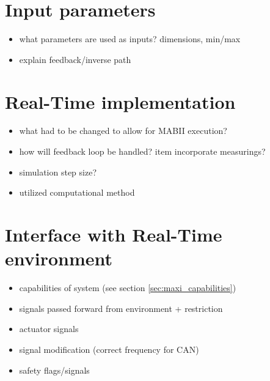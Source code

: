 \documentclass[ExampleMasters.tex]{subfiles}
\begin{document}
\section{Input parameters}
\label{sec:input_parameters}

\begin{itemize}
	\item what parameters are used as inputs? dimensions, min/max
	\item explain feedback/inverse path
	
\end{itemize}

\section{Real-Time implementation}
\label{sec:real_time_implementation}

\begin{itemize}
	\item what had to be changed to allow for MABII execution?
	\item how will feedback loop be handled?
	item incorporate measurings?
	\item simulation step size?
	\item utilized computational method
\end{itemize}

\section{Interface with Real-Time environment}
\label{sec:interface_with_real_time}

\begin{itemize}
	\item capabilities of system (see section \ref{sec:maxi_capabilities})
	\item signals passed forward from environment + restriction
	
	\item actuator signals
	\item signal modification (correct frequency for CAN)
	\item safety flags/signals
	
\end{itemize}
\end{document}
